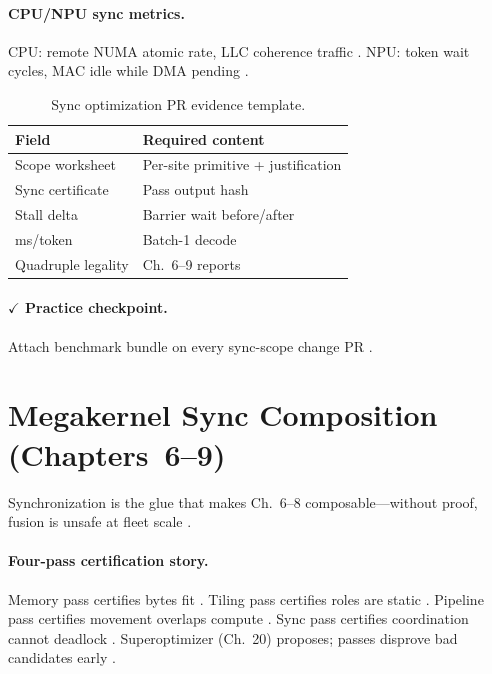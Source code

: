 \paragraph{CPU/NPU sync metrics.}
CPU: remote NUMA atomic rate, LLC coherence traffic \citep{dlbook,patel2025llminference,memoryfloor2026}.
NPU: token wait cycles, MAC idle while DMA pending \citep{amd2024xdna,amd2024aie,yirage2026}.

\begin{table}[t]
\centering
\small
\caption{Sync optimization PR evidence template.}
\label{tab:ch09_pr_template}
\begin{tabular}{@{}ll@{}}
\toprule
\textbf{Field} & \textbf{Required content} \\
\midrule
Scope worksheet & Per-site primitive + justification \\
Sync certificate & Pass output hash \\
Stall delta & Barrier wait before/after \\
ms/token & Batch-1 decode \\
Quadruple legality & Ch.~6--9 reports \\
\bottomrule
\end{tabular}
\end{table}

\paragraph{$\checkmark$ Practice checkpoint.}
Attach benchmark bundle on every sync-scope change PR \citep{yirage2026,chen2020compilerbasedhardw,taxbreak2026}.

\section{Megakernel Sync Composition (Chapters~6--9)}
\label{sec:ch09_megakernel_composition}

Synchronization is the glue that makes Ch.~6--8 composable---without proof, fusion is unsafe at fleet scale \citep{yirage2026,wu2024mirage,mpk2025,shah2024flashattention3}.

\paragraph{Four-pass certification story.}
Memory pass certifies bytes fit \citep{dao2022flashattention,chen2020compilerbasedhardw}.
Tiling pass certifies roles are static \citep{shah2024flashattention3,mpk2025}.
Pipeline pass certifies movement overlaps compute \citep{semianalysis2024tma,yirage2026}.
Sync pass certifies coordination cannot deadlock \citep{wu2024mirage,yirage2026,patel2025llminference}.
Superoptimizer (Ch.~20) proposes; passes disprove bad candidates early \citep{mpk2025,taxbreak2026,chen2020compilerbasedhardw}.

